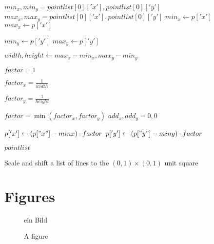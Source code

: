 \begin{algorithm}[h]
    \begin{algorithmic}
            \State $min_x, min_y = pointlist[0]['x'], pointlist[0]['y']$
            \State $max_x, max_y = pointlist[0]['x'], pointlist[0]['y']$
                        \State $min_x \gets p['x']$
                        \State $max_x \gets p['x']$
                    \EndIf

                        \State $min_y \gets p['y']$
                        \State $max_y \gets p['y']$
                    \EndIf
                \EndFor
            \EndFor

            \State $width, height \gets max_x - min_x, max_y - min_y$

            \State $factor = 1$

                \State $factor_x = \frac{1}{width}$
            \EndIf

                \State $factor_y = \frac{1}{height}$
            \EndIf

            \State $factor = \min(factor_x, factor_y)$
            \State $add_x, add_y = 0, 0$

                    \State $p['x'] \gets (p["x"] - minx) \cdot factor$
                    \State $p['y'] \gets (p["y"] - miny) \cdot factor$
                \EndFor
            \EndFor

            \Return $pointlist$
        \EndFunction
    \end{algorithmic}
\caption{Scale and shift a list of lines to the $(0,1) \times (0, 1)$ unit square}
\label{alg:scale-and-shift}
\end{algorithm}

\section{Figures}\label{appendix:figures}
\setcounter{figure}{0}
\begin{figure} [ht]
    \centering
    ein Bild
    \caption{A figure}
    \label{fig:BPMNBeispiela}
\end{figure}
